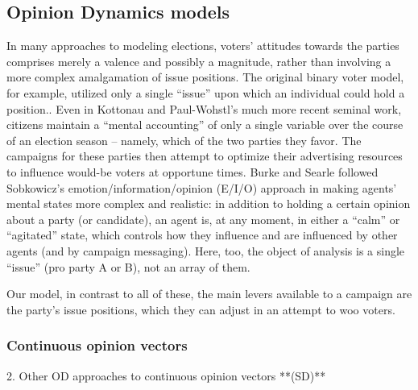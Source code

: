 \subsection{Opinion Dynamics models}
In many approaches to modeling elections, voters' attitudes towards the parties
comprises merely a valence and possibly a magnitude, rather than involving a
more complex amalgamation of issue positions. The original binary voter model,
for example, utilized only a single ``issue'' upon which an individual could
hold a position.\cite{holley_ergodic_1975,clifford_model_1973}. Even in
Kottonau and Paul-Wohstl's much more recent seminal
work\cite{kottonau_simulating_2004}, citizens maintain a ``mental accounting''
of only a single variable over the course of an election season -- namely,
which of the two parties they favor. The campaigns for these parties then
attempt to optimize their advertising resources to influence would-be voters at
opportune times. Burke and Searle\cite{burke_quantitatively_2022} followed
Sobkowicz's emotion/information/opinion (E/I/O)
approach\cite{sobkowicz_quantitative_2016} in making agents' mental states more
complex and realistic: in addition to holding a certain opinion about a party
(or candidate), an agent is, at any moment, in either a ``calm'' or
``agitated'' state, which controls how they influence and are influenced by
other agents (and by campaign messaging). Here, too, the object of analysis is
a single ``issue'' (pro party A or B), not an array of them.

Our model, in contrast to all of these, the main levers available to a campaign
are the party's issue positions, which they can adjust in an attempt to woo
voters.

\subsubsection{Continuous opinion vectors}
    2. Other OD approaches to continuous opinion vectors **(SD)**



